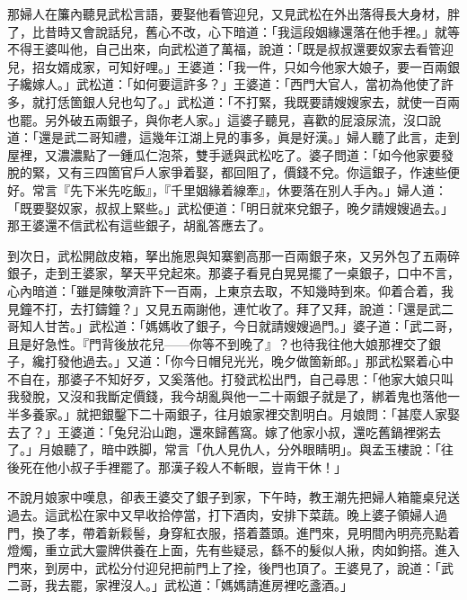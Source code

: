 那婦人在簾內聽見武松言語，要娶他看管迎兒，又見武松在外出落得長大身材，胖了，比昔時又會說話兒，舊心不改，心下暗道：「我這段姻緣還落在他手裡。」就等不得王婆叫他，{}自己出來，向武松道了萬福，說道：「既是叔叔還要奴家去看管迎兒，招女婿成家，可知好哩。」王婆道：「我一件，只如今他家大娘子，要一百兩銀子纔嫁人。」武松道：「如何要這許多？」王婆道：「西門大官人，當初為他使了許多，就打恁箇銀人兒也勾了。」武松道：「不打緊，我既要請嫂嫂家去，就使一百兩也罷。另外破五兩銀子，與你老人家。」這婆子聽見，喜歡的屁滾尿流，沒口說道：「還是武二哥知禮，這幾年江湖上見的事多，眞是好漢。」婦人聽了此言，走到屋裡，又濃濃點了一鍾瓜仁泡茶，雙手遞與武松吃了。婆子問道：「如今他家要發脫的緊，又有三四箇官戶人家爭着娶，都回阻了，價錢不兌。你這銀子，作速些便好。常言『先下米先吃飯』，『千里姻緣着線牽』，休要落在別人手內。」婦人道：「既要娶奴家，叔叔上緊些。」{}武松便道：「明日就來兌銀子，晚夕請嫂嫂過去。」那王婆還不信武松有這些銀子，胡亂答應去了。

到次日，武松開啟皮箱，拏出施恩與知寨劉高那一百兩銀子來，又另外包了五兩碎銀子，走到王婆家，拏天平兌起來。那婆子看見白晃晃擺了一桌銀子，口中不言，心內暗道：「雖是陳敬濟許下一百兩，上東京去取，不知幾時到來。仰着合着，我見鐘不打，去打鑄鐘？」又見五兩謝他，連忙收了。拜了又拜，說道：「還是武二哥知人甘苦。」武松道：「媽媽收了銀子，今日就請嫂嫂過門。」婆子道：「武二哥，且是好急性。『門背後放花兒——你等不到晚了』？{}也待我往他大娘那裡交了銀子，纔打發他過去。」又道：「你今日帽兒光光，晚夕做箇新郎。」那武松緊着心中不自在，那婆子不知好歹，又奚落他。打發武松出門，自己尋思：「他家大娘只叫我發脫，又沒和我斷定價錢，我今胡亂與他一二十兩銀子就是了，綁着鬼也落他一半多養家。」就把銀鑿下二十兩銀子，往月娘家裡交割明白。月娘問：「甚麼人家娶去了？」王婆道：「兔兒沿山跑，還來歸舊窩。嫁了他家小叔，還吃舊鍋裡粥去了。」月娘聽了，暗中跌脚，常言「仇人見仇人，分外眼睛明」。與孟玉樓說：「往後死在他小叔子手裡罷了。{}那漢子殺人不斬眼，豈肯干休！」

不說月娘家中嘆息，卻表王婆交了銀子到家，下午時，教王潮先把婦人箱籠桌兒送過去。這武松在家中又早收拾停當，打下酒肉，安排下菜蔬。晚上婆子領婦人過門，換了孝，帶着新鬏髻，身穿紅衣服，搭着蓋頭。進門來，見明間內明亮亮點着燈燭，重立武大靈牌供養在上面，先有些疑忌，繇不的髮似人揪，肉如鉤搭。進入門來，到房中，武松分付迎兒把前門上了拴，後門也頂了。王婆見了，說道：「武二哥，我去罷，家裡沒人。」武松道：「媽媽請進房裡吃盞酒。」

